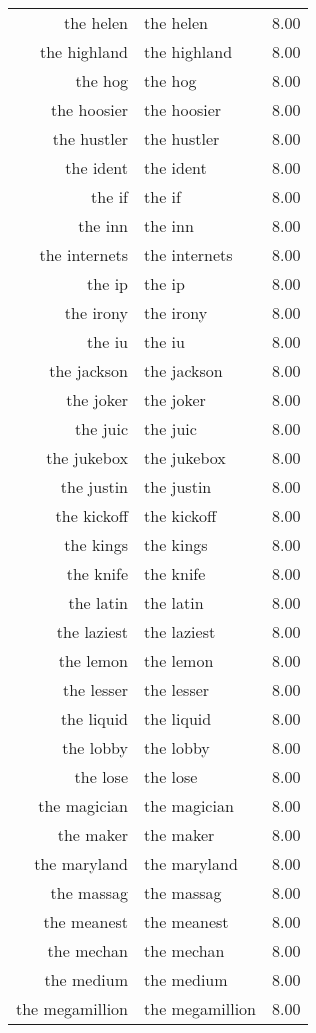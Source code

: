 \begin{table}[ht]
\begin{tabular}{rlr}
  the helen & the helen & 8.00 \\ 
  the highland & the highland & 8.00 \\ 
  the hog & the hog & 8.00 \\ 
  the hoosier & the hoosier & 8.00 \\ 
  the hustler & the hustler & 8.00 \\ 
  the ident & the ident & 8.00 \\ 
  the if & the if & 8.00 \\ 
  the inn & the inn & 8.00 \\ 
  the internets & the internets & 8.00 \\ 
  the ip & the ip & 8.00 \\ 
  the irony & the irony & 8.00 \\ 
  the iu & the iu & 8.00 \\ 
  the jackson & the jackson & 8.00 \\ 
  the joker & the joker & 8.00 \\ 
  the juic & the juic & 8.00 \\ 
  the jukebox & the jukebox & 8.00 \\ 
  the justin & the justin & 8.00 \\ 
  the kickoff & the kickoff & 8.00 \\ 
  the kings & the kings & 8.00 \\ 
  the knife & the knife & 8.00 \\ 
  the latin & the latin & 8.00 \\ 
  the laziest & the laziest & 8.00 \\ 
  the lemon & the lemon & 8.00 \\ 
  the lesser & the lesser & 8.00 \\ 
  the liquid & the liquid & 8.00 \\ 
  the lobby & the lobby & 8.00 \\ 
  the lose & the lose & 8.00 \\ 
  the magician & the magician & 8.00 \\ 
  the maker & the maker & 8.00 \\ 
  the maryland & the maryland & 8.00 \\ 
  the massag & the massag & 8.00 \\ 
  the meanest & the meanest & 8.00 \\ 
  the mechan & the mechan & 8.00 \\ 
  the medium & the medium & 8.00 \\ 
  the megamillion & the megamillion & 8.00 \\ 

\end{tabular}
\end{table}

